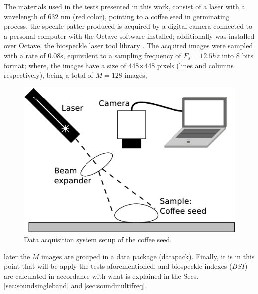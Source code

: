 \documentclass[review]{elsarticle}
\begin{document}
The materials used in the tests presented in this work, 
consist of a laser with a wavelength of 632 nm (red color), pointing to
a coffee seed in germinating process, the speckle patter produced is acquired by
a digital camera connected to a personal computer with the Octave software \cite{OCTAVE} installed;
additionally was installed over Octave, the
biospeckle laser tool library \cite{BSLTLBOOK,BSLTL}.
The acquired images were sampled with a rate of $0.08$s, equivalent to a 
sampling frequency of $F_s=12.5hz$ into 8 bits format; where,
the images have a size of 448$\times$448 pixels (lines and columns respectively), being
a total of $M=128$ images, 
\begin{figure}[ht!]
\centering
\includegraphics[width=0.55\columnwidth]{system.eps}
\caption{Data acquisition system setup of the coffee seed.  }
\label{fig:system}
\end{figure}
later the $M$ images are grouped in a data package (datapack).
Finally, it is in this point that will be apply the tests
aforementioned, and biospeckle indexes ($BSI$) are calculated 
in accordance with what is explained in the Secs. \ref{sec:soundsingleband} and \ref{sec:soundmultifreq}.


\end{document}

